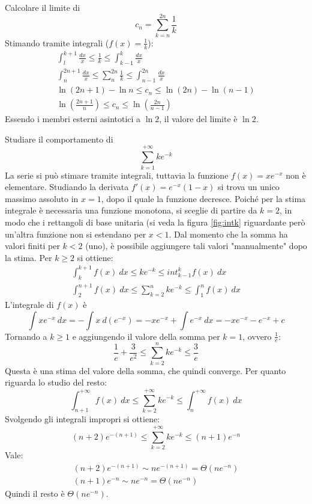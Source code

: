 \begin{examp}
	Calcolare il limite di
	\[
		c_n=\sum_{k=n}^{2n} \frac{1}{k}
	\]
	Stimando tramite integrali ($f(x)=\frac{1}{k}$):
	\begin{gather*}
		\int_l^{k+1}\frac{dx}{x}\leq \frac{1}{k}\leq \int_{k-1}^k \frac{dx}{x}\\
		\int_n^{2n+1}\frac{dx}x \leq \sum_{n}^{2n} \frac{1}{k} \leq \int_{n-1}^{2n} \frac{dx}{x}\\
		\ln(2n+1)-\ln n \leq c_n \leq \ln(2n) -\ln(n-1)\\
		\ln\left(\frac{2n+1}{n}\right) \leq c_n \leq \ln\left(\frac{2n}{n-1}\right)
	\end{gather*}
	Essendo i membri esterni asintotici a $\ln 2$, il valore del limite è $\ln 2$.
\end{examp}

\begin{examp}
	Studiare il comportamento di
	\[
		\sum_{k=1}^{+\infty} ke^{-k}
	\]
	La serie si può stimare tramite integrali, tuttavia la funzione $f(x)=xe^{-x}$ non è elementare. Studiando la derivata $f'(x)=e^{-x}(1-x)$ si trova un unico massimo assoluto in $x=1$, dopo il quale la funzione decresce. Poiché per la stima integrale è necessaria una funzione monotona, si sceglie di partire da $k=2$, in modo che i rettangoli di base unitaria (si veda la figura \ref{fig:intk} riguardante però un'altra funzione non si estendano per $x<1$. Dal momento che la somma ha valori finiti per $k<2$ (uno), è possibile aggiungere tali valori "manualmente" dopo la stima. Per $k\geq2$ si ottiene:
	\begin{gather*}
		\int_k^{k+1} f(x)~dx \leq ke^{-k} \leq int_{k-1}^k f(x)~dx\\
		\int_2^{n+1} f(x)~dx \leq \sum_{k=2}^n ke^{-k} \leq \int_1^n f(x)~dx
	\end{gather*}
	L'integrale di $f(x)$ è
	\[
		\int xe^{-x}~dx=-\int x~d(e^{-x})=-xe^{-x}+\int e^{-x}~dx=-xe^{-x}-e^{-x}+c
	\]
	Tornando a $k\geq1$ e aggiungendo il valore della somma per $k=1$, ovvero $\frac{1}{e}$:
	\[
		\frac{1}{e}+\frac{3}{e^2} \leq \sum_{k=2}^n ke^{-k} \leq \frac{3}{e}
	\]
	Questa è una stima del valore della somma, che quindi converge. Per quanto riguarda lo studio del resto:
	\[
		\int_{n+1}^{+\infty} f(x)~dx \leq \sum_{k=2}^{+\infty} ke^{-k} \leq \int_n^{+\infty} f(x)~dx
	\]
	Svolgendo gli integrali impropri si ottiene:
	\[
		(n+2)e^{-(n+1)} \leq \sum_{k=2}^{+\infty} ke^{-k} \leq (n+1)e^{-n}
	\]
	Vale:
	\begin{gather*}
		(n+2)e^{-(n+1)}\sim ne^{-(n+1)}=\Theta(ne^{-n})\\
		(n+1)e^{-n}\sim ne^{-n}=\Theta(ne^{-n})
	\end{gather*}
	Quindi il resto è $\Theta(ne^{-n})$.
\end{examp}


